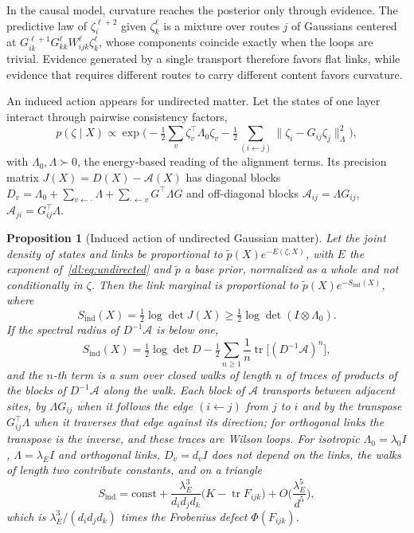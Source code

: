 \documentclass[11pt]{article}
\newtheorem{proposition}[theorem]{Proposition}
\theoremstyle{definition}
\theoremstyle{remark}
\providecommand{\tr}{\operatorname{tr}}
\begin{document}
In the causal model, curvature reaches the posterior only through evidence. The predictive law of $\zeta_i^{\ell+2}$ given $\zeta_k^\ell$ is a mixture over routes $j$ of Gaussians centered at $G_{ik}^{\ell+1}G_{kk}^\ell W_{ijk}^\ell\zeta_k^\ell$, whose components coincide exactly when the loops are trivial. Evidence generated by a single transport therefore favors flat links, while evidence that requires different routes to carry different content favors curvature.

An induced action appears for undirected matter. Let the states of one layer interact through pairwise consistency factors,
\begin{equation}
p(\zeta\mid X)\propto\exp\Big(-\tfrac12\sum_v\zeta_v^\top\Lambda_0\zeta_v-\tfrac12\sum_{(i\leftarrow j)}\|\zeta_i-G_{ij}\zeta_j\|_\Lambda^2\Big),
\label{dl:eq:undirected}
\end{equation}
with $\Lambda_0,\Lambda\succ0$, the energy-based reading of the alignment terms. Its precision matrix $J(X)=D(X)-\mathcal A(X)$ has diagonal blocks $D_v=\Lambda_0+\sum_{v\leftarrow\cdot}\Lambda+\sum_{\cdot\leftarrow v}G^\top\Lambda G$ and off-diagonal blocks $\mathcal A_{ij}=\Lambda G_{ij}$, $\mathcal A_{ji}=G_{ij}^\top\Lambda$.

\begin{proposition}[Induced action of undirected Gaussian matter]
\label{dl:prop:induced}
Let the joint density of states and links be proportional to $\tilde p(X)e^{-E(\zeta,X)}$, with $E$ the exponent of~\eqref{dl:eq:undirected} and $\tilde p$ a base prior, normalized as a whole and not conditionally in $\zeta$. Then the link marginal is proportional to $\tilde p(X)e^{-S_{\mathrm{ind}}(X)}$, where
\begin{equation}
S_{\mathrm{ind}}(X)=\tfrac12\log\det J(X)\ge\tfrac12\log\det(I\otimes\Lambda_0).
\label{dl:eq:induced}
\end{equation}
If the spectral radius of $D^{-1}\mathcal A$ is below one,
\begin{equation}
S_{\mathrm{ind}}(X)=\tfrac12\log\det D-\tfrac12\sum_{n\ge1}\frac1n\tr\big[(D^{-1}\mathcal A)^n\big],
\label{dl:eq:hopping}
\end{equation}
and the $n$-th term is a sum over closed walks of length $n$ of traces of products of the blocks of $D^{-1}\mathcal A$ along the walk. Each block of $\mathcal A$ transports between adjacent sites, by $\Lambda G_{ij}$ when it follows the edge $(i\leftarrow j)$ from $j$ to $i$ and by the transpose $G_{ij}^\top\Lambda$ when it traverses that edge against its direction; for orthogonal links the transpose is the inverse, and these traces are Wilson loops. For isotropic $\Lambda_0=\lambda_0I$, $\Lambda=\lambda_EI$ and orthogonal links, $D_v=d_vI$ does not depend on the links, the walks of length two contribute constants, and on a triangle
\begin{equation}
S_{\mathrm{ind}}=\text{const}+\frac{\lambda_E^3}{d_id_jd_k}\big(K-\tr F_{ijk}\big)+O\Big(\frac{\lambda_E^5}{d^5}\Big),
\label{dl:eq:wilson}
\end{equation}
which is $\lambda_E^3/(d_id_jd_k)$ times the Frobenius defect $\Phi(F_{ijk})$.
\end{proposition}
\end{document}
